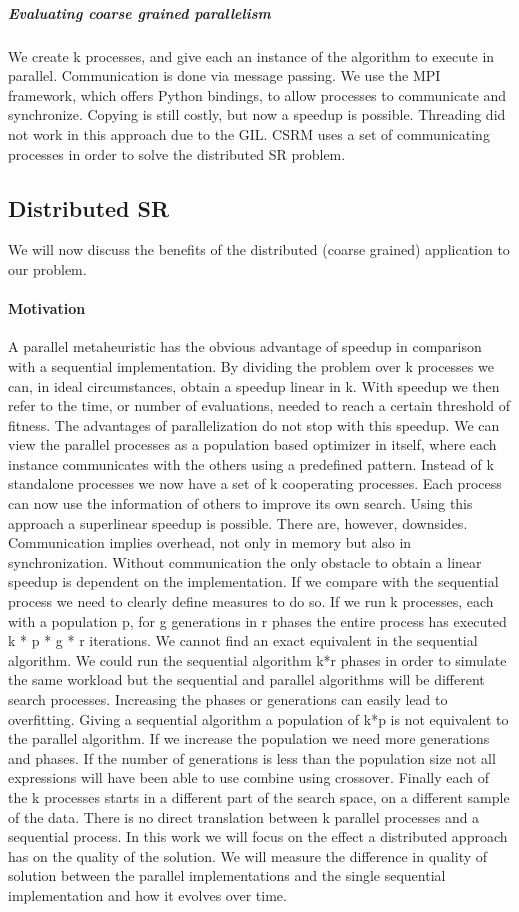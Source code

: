 \subparagraph{Evaluating coarse grained parallelism}
We create k processes, and give each an instance of the algorithm to execute in parallel. Communication is done via message passing. We use the MPI framework, which offers Python bindings, to allow processes to communicate and synchronize. Copying is still costly, but now a speedup is possible. Threading did not work in this approach due to the GIL.
CSRM uses a set of communicating processes in order to solve the distributed SR problem.

\subsection{Distributed SR}
We will now discuss the benefits of the distributed (coarse grained) application to our problem.

\paragraph{Motivation}
A parallel metaheuristic has the obvious advantage of speedup in comparison with a sequential implementation. By dividing the problem over k processes we can, in ideal circumstances, obtain a speedup linear in k. With speedup we then refer to the time, or number of evaluations, needed to reach a certain threshold of fitness. The advantages of parallelization do not stop with this speedup. We can view the parallel processes as a population based optimizer in itself, where each instance communicates with the others using a predefined pattern. Instead of k standalone processes we now have a set of k cooperating  processes. Each process can now use the information of others to improve its own search. Using this approach a superlinear speedup is possible. There are, however, downsides. Communication implies overhead, not only in memory but also in synchronization. Without communication the only obstacle to obtain a linear speedup is dependent on the implementation. If we compare with the sequential process we need to clearly define measures to do so. If we run k processes, each with a population p, for g generations in r phases the entire process has executed k * p * g * r iterations. We cannot find an exact equivalent in the sequential algorithm. We could run the sequential algorithm k*r phases in order to simulate the same workload but the sequential and parallel algorithms will be different search processes. Increasing the phases or generations can easily lead to overfitting. Giving a sequential algorithm a population of k*p is not equivalent to the parallel algorithm. If we increase the population we need more generations and phases. If the number of generations is less than the population size not all expressions will have been able to use combine using crossover. Finally each of the k processes starts in a different part of the search space, on a different sample of the data. There is no direct translation between k parallel processes and a sequential process. 
In this work we will focus on the effect a distributed approach has on the quality of the solution. We will measure the difference in quality of solution between the parallel implementations and the single sequential implementation and how it evolves over time. 

